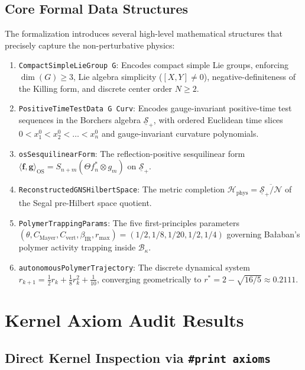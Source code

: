 \subsection{Core Formal Data Structures}
\label{subsec:formal_data_structures}

The formalization introduces several high-level mathematical structures that precisely capture the non-perturbative physics:
\begin{enumerate}
    \item \texttt{CompactSimpleLieGroup G}: Encodes compact simple Lie groups, enforcing $\dim(G) \ge 3$, Lie algebra simplicity ($[X, Y] \neq 0$), negative-definiteness of the Killing form, and discrete center order $N \ge 2$.
    \item \texttt{PositiveTimeTestData G Curv}: Encodes gauge-invariant positive-time test sequences in the Borchers algebra $\underline{\mathcal{S}}_+$, with ordered Euclidean time slices $0 < x_1^0 < x_2^0 < \dots < x_n^0$ and gauge-invariant curvature polynomials.
    \item \texttt{osSesquilinearForm}: The reflection-positive sesquilinear form $\langle \mathbf{f}, \mathbf{g} \rangle_{\mathrm{OS}} = S_{n+m}(\Theta f_n^* \otimes g_m)$ on $\underline{\mathcal{S}}_+$.
    \item \texttt{ReconstructedGNSHilbertSpace}: The metric completion $\mathcal{H}_{\mathrm{phys}} = \overline{\underline{\mathcal{S}}_+ / \mathcal{N}}$ of the Segal pre-Hilbert space quotient.
    \item \texttt{PolymerTrappingParams}: The five first-principles parameters $(\theta, C_{\mathrm{Mayer}}, C_{\mathrm{vert}}, \beta_{\mathrm{IR}}, r_{\max}) = (1/2, 1/8, 1/20, 1/2, 1/4)$ governing Ba\l aban's polymer activity trapping inside $\mathcal{B}_\kappa$.
    \item \texttt{autonomousPolymerTrajectory}: The discrete dynamical system $r_{k+1} = \frac{1}{2} r_k + \frac{1}{8} r_k^2 + \frac{1}{10}$, converging geometrically to $r^* = 2 - \sqrt{16/5} \approx 0.2111$.
\end{enumerate}

\section{Kernel Axiom Audit Results}
\label{sec:kernel_axiom_audit}

\subsection{Direct Kernel Inspection via \texorpdfstring{\texttt{\#print axioms}}{\#print axioms}}
\label{subsec:kernel_print_axioms}


